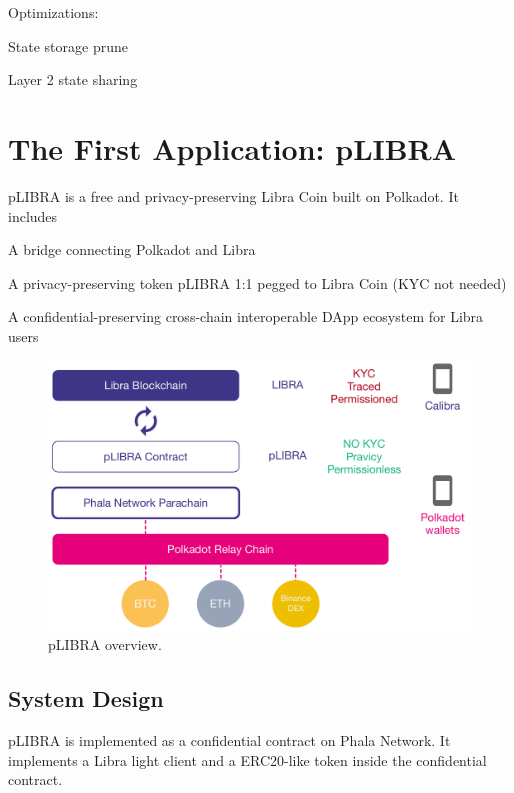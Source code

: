 Optimizations:

\begin{icompact}
    \item State storage prune
    \item Layer 2 state sharing
\end{icompact}


\section{The First Application: pLIBRA}

pLIBRA is a free and privacy-preserving Libra Coin built on Polkadot. It includes

\begin{icompact}
    \item A bridge connecting Polkadot and Libra
    \item A privacy-preserving token pLIBRA 1:1 pegged to Libra Coin (KYC not needed)
    \item A confidential-preserving cross-chain interoperable DApp ecosystem for Libra users
\end{icompact}

\begin{figure}
    \centering \footnotesize
    \includegraphics[width=.7\columnwidth]{img/pLIBRA-structure}
    \caption{pLIBRA overview.}
    \label{fig:plibra}
\end{figure}

\subsection{System Design}

pLIBRA is implemented as a confidential contract on Phala Network. It implements a Libra light client and a ERC20-like token inside the confidential contract.

